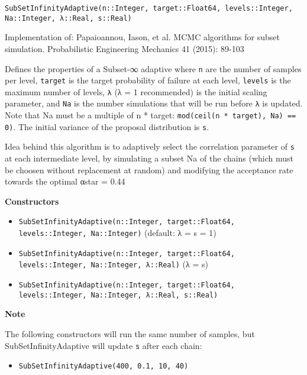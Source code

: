 \begin{adjustwidth}{2em}{0pt}


\begin{verbatim}
SubSetInfinityAdaptive(n::Integer, target::Float64, levels::Integer, Na::Integer, λ::Real, s::Real)
\end{verbatim}

Implementation of: Papaioannou, Iason, et al. {\textquotedbl}MCMC algorithms for subset simulation.{\textquotedbl} Probabilistic Engineering Mechanics 41 (2015): 89-103

Defines the properties of a Subset-∞ adaptive where \texttt{n} are the number of samples per level, \texttt{target} is the target probability of failure at each level, \texttt{levels} is the maximum number of levels, \texttt{λ} (λ = 1 recommended) is the initial scaling parameter, and \texttt{Na} is the number simulations that will be run before \texttt{λ} is updated. Note that Na must be a multiple of n * target: \texttt{mod(ceil(n * target), Na) == 0)}. The initial variance of the proposal distribution is \texttt{s}.

Idea behind this algorithm is to adaptively select the correlation parameter of \texttt{s} at each intermediate level, by simulating a subset Na of the chains (which must be choosen without replacement at random) and modifying the acceptance rate towards the optimal αstar = 0.44

\textbf{Constructors}

\begin{itemize}
\item \texttt{SubSetInfinityAdaptive(n::Integer, target::Float64, levels::Integer, Na::Integer)}   (default: λ = s = 1)


\item \texttt{SubSetInfinityAdaptive(n::Integer, target::Float64, levels::Integer, Na::Integer, λ::Real)} (λ = s)


\item \texttt{SubSetInfinityAdaptive(n::Integer, target::Float64, levels::Integer, Na::Integer, λ::Real, s::Real)}

\end{itemize}
\textbf{Note}

The following constructors will run the same number of samples, but SubSetInfinityAdaptive will update \texttt{s} after each chain:

\begin{itemize}
\item \texttt{SubSetInfinityAdaptive(400, 0.1, 10, 40)}



\end{itemize}
\end{adjustwidth}
